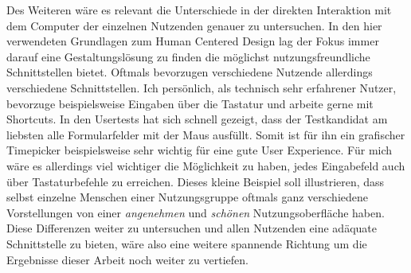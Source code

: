 Des Weiteren wäre es relevant die Unterschiede in der direkten Interaktion mit
dem Computer der einzelnen Nutzenden genauer zu untersuchen. In den hier
verwendeten Grundlagen zum Human Centered Design lag der Fokus immer darauf
eine Gestaltungslösung zu finden die möglichst nutzungsfreundliche
Schnittstellen bietet\cite{hcd}. Oftmals bevorzugen verschiedene Nutzende
allerdings verschiedene Schnittstellen. Ich persönlich, als technisch sehr
erfahrener Nutzer, bevorzuge beispielsweise Eingaben über die Tastatur und
arbeite gerne mit Shortcuts. In den Usertests hat sich schnell gezeigt, dass
der Testkandidat am liebsten alle Formularfelder mit der Maus ausfüllt. Somit
ist für ihn ein grafischer Timepicker beispielsweise sehr wichtig für eine gute
User Experience. Für mich wäre es allerdings viel wichtiger die Möglichkeit zu
haben, jedes Eingabefeld auch über Tastaturbefehle zu erreichen. Dieses kleine
Beispiel soll illustrieren, dass selbst einzelne Menschen einer Nutzungsgruppe
oftmals ganz verschiedene Vorstellungen von einer \textit{angenehmen} und
\textit{schönen} Nutzungsoberfläche haben. Diese Differenzen weiter zu
untersuchen und allen Nutzenden eine adäquate Schnittstelle zu bieten, wäre also
eine weitere spannende Richtung um die Ergebnisse dieser Arbeit noch weiter zu
vertiefen.